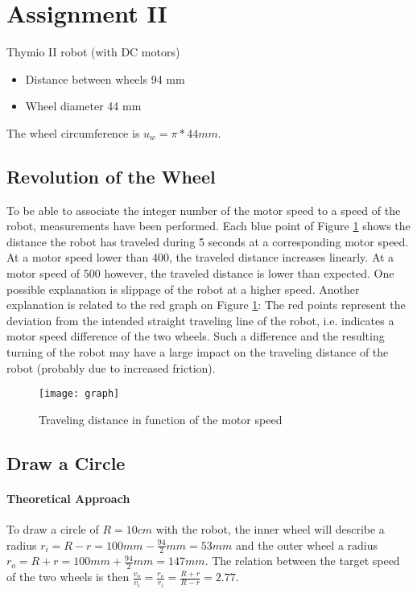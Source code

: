 \documentclass[paper=a4, fontsize=11pt]{scrartcl} %
\begin{document}

\section{Assignment II}

Thymio II robot (with DC motors)
\begin{itemize}
\item Distance between wheels 94 mm
\item Wheel diameter 44 mm
\end{itemize}

The wheel circumference is $ u_w = \pi * 44 mm $.

\subsection{Revolution of the Wheel}
\label{rev}
To be able to associate the integer number of the motor speed to a speed of the
robot, measurements have been performed. Each blue point of Figure
\ref{fig:dist} shows the distance the robot has traveled during 5 seconds at
a corresponding motor speed. At a motor speed lower than 400, the traveled
distance increases linearly. At a motor speed of 500 however, the traveled
distance is lower than expected. One possible explanation is slippage of the
robot at a higher speed. Another explanation is related to the red graph on
Figure \ref{fig:dist}: The red points represent the deviation from the intended
straight traveling line of the robot, i.e. indicates a motor speed difference
of the two wheels. Such a difference and the resulting turning of the robot may
have a large impact on the traveling distance of the robot (probably due to
increased friction).
\begin{figure}[h]
    \texttt{[image: graph]} %
    \caption{Traveling distance in function of the motor speed}\label{fig:dist}
\end{figure}


\subsection{Draw a Circle}
\paragraph{Theoretical Approach}
To draw a circle of $ R = 10 cm $ with the robot, the inner wheel will describe
a radius $ r_i = R - r = 100 mm - \frac{94}{2} mm = 53 mm $ and the outer wheel
a radius $ r_o = R + r = 100 mm + \frac{94}{2} mm = 147 mm $. The relation
between the target speed of the two wheels is then $ \frac{v_o}{v_i}
= \frac{r_o}{r_i} = \frac{R + r}{R - r} = 2.77 $.
\end{document}
